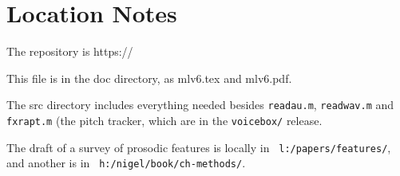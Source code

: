 \documentclass[11pt]{article}
\begin{document}
\section{Location Notes}

The repository is https://

This file is in the doc directory, as mlv6.tex and mlv6.pdf.

The src directory includes everything needed besides 
{\tt readau.m}, {\tt readwav.m} and {\tt fxrapt.m} (the pitch
  tracker, which are in the {\tt voicebox/} release.

The draft of a survey of prosodic features is locally in {\tt
  l:/papers/features/}, and another is in {\tt
  h:/nigel/book/ch-methods/}.




\end{document}
